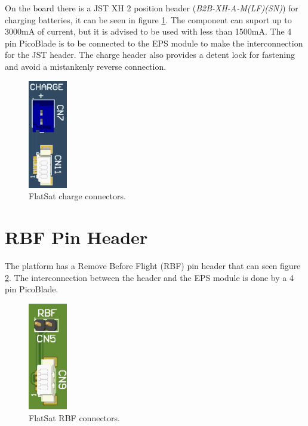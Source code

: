 On the board there is a JST XH 2 position header (\textit{B2B-XH-A-M(LF)(SN)}) for charging batteries, it can be seen in figure \ref{fig:charge-connectors}. The component can suport up to 3000mA of current, but it is advised to be used with less than 1500mA. The 4 pin PicoBlade is to be connected to the EPS module to make the interconnection for the JST header. The charge header also provides a detent lock for fastening and avoid a mistankenly reverse connection.

\begin{figure}[!ht]
    \begin{center}
        \includegraphics[width=0.15\textwidth]{figures/charge_connectors.png}
        \caption{FlatSat charge connectors.}
        \label{fig:charge-connectors}
    \end{center}
\end{figure}

\section{RBF Pin Header}

The platform has a Remove Before Flight (RBF) pin header that can seen figure \ref{fig:rbf-connectors}. The interconnection between the header and the EPS module is done by a 4 pin PicoBlade.

\begin{figure}[!ht]
    \begin{center}
        \includegraphics[width=0.15\textwidth]{figures/rbf_connectors.png}
        \caption{FlatSat RBF connectors.}
        \label{fig:rbf-connectors}
    \end{center}
\end{figure}

